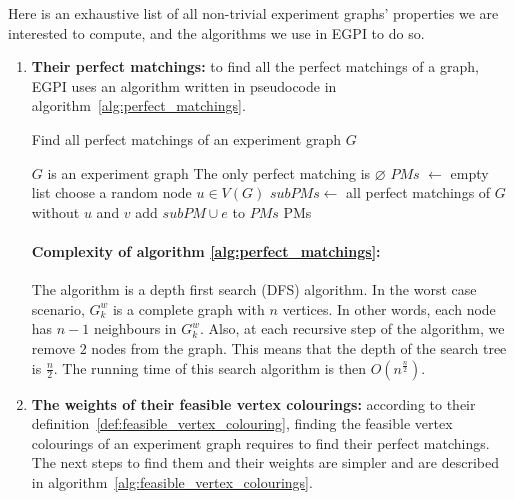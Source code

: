 Here is an exhaustive list of all non-trivial experiment graphs' properties we are interested to compute, and the algorithms we use in EGPI to do so.

\begin{enumerate}
    \item \textbf{Their perfect matchings:} to find all the perfect matchings of a graph, EGPI uses an algorithm written in pseudocode in algorithm~\ref{alg:perfect_matchings}.

        \begin{algorithm}
            \caption{Find all perfect matchings of an experiment graph $G$}
            \label{alg:perfect_matchings}
            \begin{algorithmic}
                \Require $G$ is an experiment graph
                    \State The only perfect matching is $\varnothing$
                    \State $PMs$ $\gets$ empty list
                    \State choose a random node $u \in V(G)$
                        \State $subPMs \gets$ all perfect matchings of $G$ without $u$ and $v$
                                \State add $subPM \cup e$ to $PMs$
                            \EndFor
                        \EndFor
                    \EndFor
                \EndIf
                \State \Return PMs
            \end{algorithmic}
        \end{algorithm}

        \paragraph{Complexity of algorithm \ref {alg:perfect_matchings}:}
        The algorithm is a depth first search (DFS) algorithm.
        In the worst case scenario, $G_k^w$ is a complete graph with $n$ vertices.
        In other words, each node has $n-1$ neighbours in $G_k^w$.
        Also, at each recursive step of the algorithm, we remove $2$ nodes from the graph.
        This means that the depth of the search tree is $\frac{n}{2}$.
        The running time of this search algorithm is then $O\left(n^\frac{n}{2}\right)$. \\

    \item \textbf{The weights of their feasible vertex colourings:} according to their definition~\ref{def:feasible_vertex_colouring}, finding the feasible vertex colourings of an experiment graph requires to find their perfect matchings.
        The next steps to find them and their weights are simpler and are described in algorithm~\ref{alg:feasible_vertex_colourings}.


\end{enumerate}
